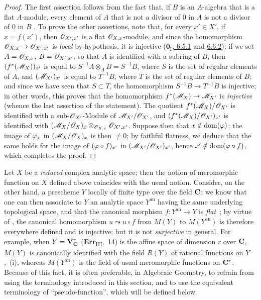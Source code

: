 \begin{proof}
The first assertion follows from the fact that, if $B$ is an $A$-algebra that is a flat $A$-module, every element of $A$ that is not a divisor of $0$ in $A$ is not a divisor of $0$ in $B$ .
To prove the other assertions, note that, for every $x'\in X'$, if $x=f(x')$, then $\mathscr{O}_{X',x'}$ is a flat $\mathscr{O}_{X,x}$-module, and since the homomorphism $\mathscr{O}_{X,x}\to\mathscr{O}_{X',x'}$ is \emph{local} by hypothesis, it is injective (\hyperref[0.6.5.1]{$\mathbf{0}_{\mathrm{I}}$, 6.5.1} and \hyperref[0.6.6.2]{6.6.2}); if we set $A=\mathscr{O}_{X,x}$, $B=\mathscr{O}_{X',x'}$, so that $A$ is identified with a subring of $B$, then $(f^*(\mathscr{M}_X))_{x'}$ is equal to $S^{-1}A\otimes_A B=S^{-1}B$, where $S$ is the set of regular elements of $A$, and $(\mathscr{M}_{X'})_{x'}$ is equal to $T^{-1}B$, where $T$ is the set
of regular elements of $B$; and since we have seen that $S\subset T$, the homomorphism $S^{-1}B\to T^{-1}B$ is injective; in other words, this proves that the homomorphism  $f^*(\mathscr{M}_X)\to\mathscr{M}_{X'}$ is \emph{injective} (whence the last assertion of the statement).
The quotient $f^*(\mathscr{M}_X)/\mathscr{O}_{X'}$ is identified with a sub-$\mathscr{O}_{X'}$-Module of $\mathscr{M}_{X'}/\mathscr{O}_{X'}$, and $(f^*(\mathscr{M}_X)/\mathscr{O}_{X'})_{x'}$ is identified with $(\mathscr{M}_X/\mathscr{O}_X)_x\otimes_{\mathscr{O}_{X,x}}\mathscr{O}_{X',x'}$.
Suppose then that $x\notin\operatorname{dom}(\varphi)$; the image of $\varphi_x$ in $(\mathscr{M}_X/\mathscr{O}_X)_x$ is then $\neq0$; by faithful flatness, we deduce that the same holds for the image of $(\varphi\circ f)_{x'}$ in $(\mathscr{M}_{X'}/\mathscr{O}_{X'})_{x'}$, hence $x'\notin\operatorname{dom}(\varphi\circ f)$, which completes the proof.
\end{proof}

\begin{remark}[20.1.13]
\label{IV.20.1.13}
Let $X$ be a \emph{reduced} complex analytic space; then the notion of meromorphic function on $X$ defined above coincides with the usual notion.
Consider, on the other hand, a prescheme $Y$ locally of finite type over the field $\mathbf{C}$; we know that one can then associate to $Y$ an analytic space $Y^\mathrm{an}$ having the same underlying topological space, and that the canonical morphism $f:Y^\mathrm{an}\to Y$ is \emph{flat}~\cite{IV-37}; by virtue of , the canonical homomorphism $u\leadsto u\circ f$ from $M(Y)$ to $M(Y^\mathrm{an})$ is therefore everywhere defined and is injective; but it is not \emph{surjective} in general.
For example, when $Y=\mathbf{V}_{\mathbf{C}}^r$ (\textbf{Err}\textsubscript{III},~14) is the affine space of dimension $r$ over $\mathbf{C}$, $M(Y)$ is canonically identified with the field $R(Y)$ of rational functions on $Y$ ,~(i), whereas $M(Y^\mathrm{an})$ is the field of usual meromorphic functions on $\mathbf{C}^r$.
Because of this fact, it is often preferable, in Algebraic Geometry, to refrain from using the terminology introduced in this section, and to use the equivalent terminology of ``pseudo-function'', which will be defined below.
\end{remark}


